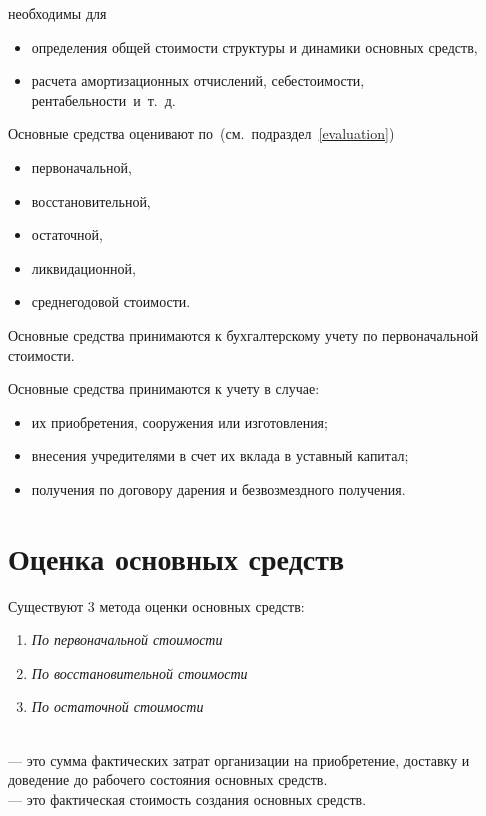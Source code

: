  необходимы для
\begin{itemize}
    \item определения общей стоимости структуры и динамики основных средств,
    \item расчета амортизационных отчислений, себестоимости,
        рентабельности~и~т.~д.
\end{itemize}

Основные средства оценивают по~(см.~подраздел~\ref{evaluation})

\begin{itemize}
    \item первоначальной,
    \item восстановительной,
    \item  остаточной,
    \item ликвидационной,
    \item среднегодовой стоимости.
\end{itemize}

\begin{important}
    Основные средства принимаются к бухгалтерскому учету по первоначальной
    стоимости.
\end{important}

Основные средства принимаются к учету в случае:

\begin{itemize}
	\item их приобретения, сооружения или изготовления;
	\item внесения учредителями в счет их вклада в уставный капитал;
	\item получения по договору дарения и безвозмездного получения.
\end{itemize}

\section{\label{evaluation}Оценка основных средств}

Существуют 3 метода оценки основных средств:

\begin{enumerate}
    \item \textit{По первоначальной стоимости}
    \item \textit{По восстановительной стоимости}
    \item \textit{По остаточной стоимости}
\end{enumerate}

\begin{definition}
    \normalfont
    ~\\
     --- это сумма фактических затрат организации
    на приобретение, доставку и доведение до рабочего состояния основных
    средств.
    ~\\
     --- это фактическая стоимость создания основных средств.
\end{definition}

